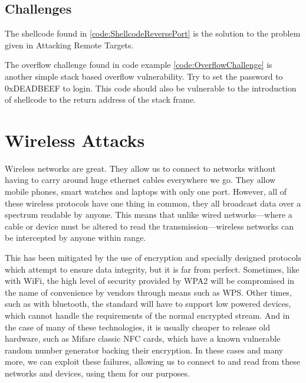 \documentclass[a4paper,11pt]{report}
\begin{document}
	\section{Challenges}
		The shellcode found in \ref{code:ShellcodeReversePort} is the solution to the problem given in Attacking Remote Targets. 
		\begin{code}
			Assembler}]{./ShellcodeReversePort.asm}
			\caption{Reverse socket connection shellcode challenge}
			\label{code:ShellcodeReversePort}
		\end{code}
		\newpage
		The overflow challenge found in code example \ref{code:OverflowChallenge} is another simple stack based overflow vulnerability. 
		Try to set the password to 0xDEADBEEF to login.
		This code should also be vulnerable to the introduction of shellcode to the return address of the stack frame. 
		\begin{code}
			C}]{./OverflowChallenge.c}
			\caption{Overflow Challenge}
			\label{code:OverflowChallenge}
		\end{code}
\chapter{Wireless Attacks}
	\label{ch:WirelessAttacks}
	Wireless networks are great. 
	They allow us to connect to networks without having to carry around huge ethernet cables everywhere we go. 
	They allow mobile phones, smart watches and laptops with only one port. 
	However, all of these wireless protocols have one thing in common, they all broadcast data over a spectrum readable by anyone. 
	This means that unlike wired networks---where a cable or device must be altered to read the transmission---wireless networks can be intercepted by anyone within range. 
	
	This has been mitigated by the use of encryption and specially designed protocols which attempt to ensure data integrity, but it is far from perfect. 
	Sometimes, like with WiFi, the high level of security provided by WPA2 will be compromised in the name of convenience by vendors through means such as WPS.
	Other times, such as with bluetooth, the standard will have to support low powered devices, which cannot handle the requirements of the normal encrypted stream. 
	And in the case of many of these technologies, it is usually cheaper to release old hardware, such as Mifare classic NFC cards, which have a known vulnerable random number generator backing their encryption. 
	In these cases and many more, we can exploit these failures, allowing us to connect to and read from these networks and devices, using them for our purposes. 
\end{document}
